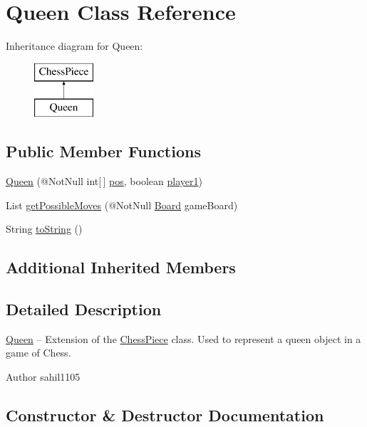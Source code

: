 \hypertarget{class_queen}{}\section{Queen Class Reference}
\label{class_queen}
Inheritance diagram for Queen\+:\begin{figure}[H]
\begin{center}
\leavevmode
\includegraphics[height=2.000000cm]{class_queen}
\end{center}
\end{figure}
\subsection*{Public Member Functions}
\begin{DoxyCompactItemize}
\item 
\mbox{\hyperlink{class_queen_a5aea03fcf281d4da2e1485f70bdc2cef}{Queen}} (@Not\+Null int\mbox{[}$\,$\mbox{]} \mbox{\hyperlink{class_chess_piece_ae9f0da2b5fca2557eab359044a7ba1ac}{pos}}, boolean \mbox{\hyperlink{class_chess_piece_aa8711ff5ce8a45159b9b30c8148a34b2}{player1}})
\item 
List \mbox{\hyperlink{class_queen_ab68db1ab8ecf2b0a85da2f824580ce82}{get\+Possible\+Moves}} (@Not\+Null \mbox{\hyperlink{class_board}{Board}} game\+Board)
\item 
String \mbox{\hyperlink{class_queen_aa646ca2f6eaf8012ff508f778389186d}{to\+String}} ()
\end{DoxyCompactItemize}
\subsection*{Additional Inherited Members}


\subsection{Detailed Description}
\mbox{\hyperlink{class_queen}{Queen}} -- Extension of the \mbox{\hyperlink{class_chess_piece}{Chess\+Piece}} class. Used to represent a queen object in a game of Chess. \begin{DoxyAuthor}{Author}
sahil1105 
\end{DoxyAuthor}


\subsection{Constructor \& Destructor Documentation}
\mbox{\label{class_queen_a5aea03fcf281d4da2e1485f70bdc2cef}} 
